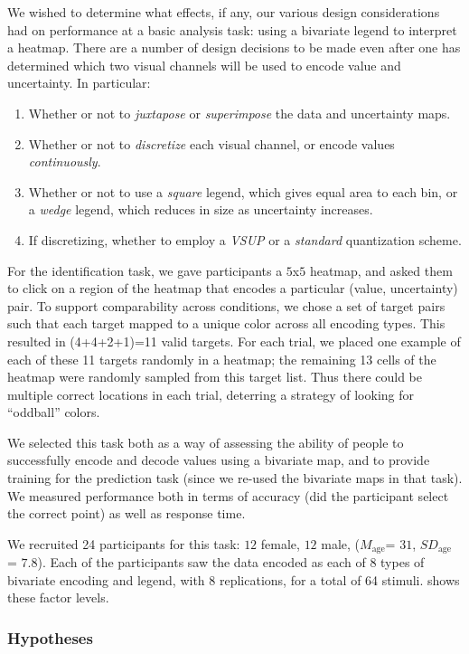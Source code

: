 We wished to determine what effects, if any, our various design considerations had on performance at a basic analysis task: using a bivariate legend to interpret a heatmap. There are a number of design decisions to be made even after one has determined which two visual channels will be used to encode value and uncertainty.
In particular:
\begin{enumerate}
	\item Whether or not to \emph{juxtapose} or \emph{superimpose} the data and uncertainty maps.
	\item Whether or not to \emph{discretize} each visual channel, or encode values \emph{continuously}.
	\item Whether or not to use a \emph{square} legend, which gives equal area to each bin, or a \emph{wedge} legend, which reduces in size as uncertainty increases.
	\item If discretizing, whether to employ a \emph{VSUP} or a \emph{standard} quantization scheme.
\end{enumerate}

For the identification task, we gave participants a $5$x$5$ heatmap, and asked them to click on a region of the heatmap that encodes a particular (value, uncertainty) pair. To support comparability across conditions, we chose a set of target pairs such that each target mapped to a unique color across all encoding types. This resulted in (4+4+2+1)=11 valid targets. For each trial, we placed one example of each of these 11 targets randomly in a heatmap; the remaining 13 cells of the heatmap were randomly sampled from this target list. Thus there could be multiple correct locations in each trial, deterring a strategy of looking for ``oddball'' colors. 

We selected this task both as a way of assessing the ability of people to successfully encode and decode values using a bivariate map, and to provide training for the prediction task (since we re-used the bivariate maps in that task). We measured performance both in terms of accuracy (did the participant select the correct point) as well as response time.

We recruited 24 participants for this task: $12$ female, $12$ male, ($M_{\text{age}}$= $31$, $SD_{\text{age}}$ = $7.8$). Each of the participants saw the data encoded as each of 8 types of bivariate encoding and legend, with 8 replications, for a total of 64 stimuli.  shows these factor levels.

\subsubsection{Hypotheses}


